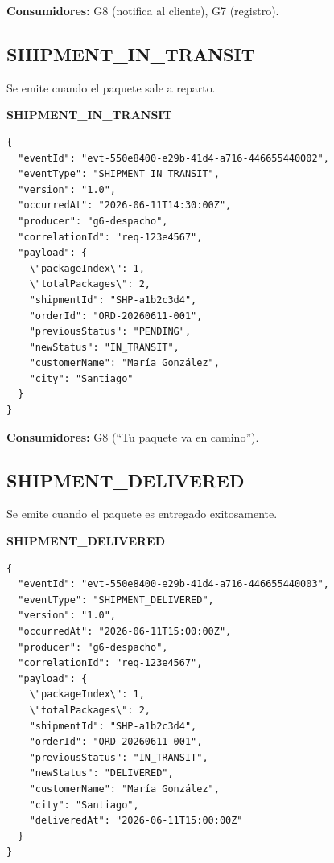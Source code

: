 \documentclass[11pt, a4paper]{article}
\newcommand{\contractheader}[1]{%
  \noindent\colorbox{primary!10}{%
    \parbox{\dimexpr\textwidth-2\fboxsep}{%
      \textbf{\faFileCode\quad #1}%
    }%
  }
  \vspace{0.3cm}
}
\begin{document}
\textbf{Consumidores:} G8 (notifica al cliente), G7 (registro).

\vspace{0.4cm}

\subsection{SHIPMENT\_IN\_TRANSIT}

Se emite cuando el paquete sale a reparto.

\contractheader{SHIPMENT\_IN\_TRANSIT}

\begin{lstlisting}
{
  "eventId": "evt-550e8400-e29b-41d4-a716-446655440002",
  "eventType": "SHIPMENT_IN_TRANSIT",
  "version": "1.0",
  "occurredAt": "2026-06-11T14:30:00Z",
  "producer": "g6-despacho",
  "correlationId": "req-123e4567",
  "payload": {
    \"packageIndex\": 1,
    \"totalPackages\": 2,
    "shipmentId": "SHP-a1b2c3d4",
    "orderId": "ORD-20260611-001",
    "previousStatus": "PENDING",
    "newStatus": "IN_TRANSIT",
    "customerName": "María González",
    "city": "Santiago"
  }
}
\end{lstlisting}

\textbf{Consumidores:} G8 (``Tu paquete va en camino'').

\vspace{0.4cm}

\subsection{SHIPMENT\_DELIVERED}

Se emite cuando el paquete es entregado exitosamente.

\contractheader{SHIPMENT\_DELIVERED}

\begin{lstlisting}
{
  "eventId": "evt-550e8400-e29b-41d4-a716-446655440003",
  "eventType": "SHIPMENT_DELIVERED",
  "version": "1.0",
  "occurredAt": "2026-06-11T15:00:00Z",
  "producer": "g6-despacho",
  "correlationId": "req-123e4567",
  "payload": {
    \"packageIndex\": 1,
    \"totalPackages\": 2,
    "shipmentId": "SHP-a1b2c3d4",
    "orderId": "ORD-20260611-001",
    "previousStatus": "IN_TRANSIT",
    "newStatus": "DELIVERED",
    "customerName": "María González",
    "city": "Santiago",
    "deliveredAt": "2026-06-11T15:00:00Z"
  }
}
\end{lstlisting}
\end{document}
